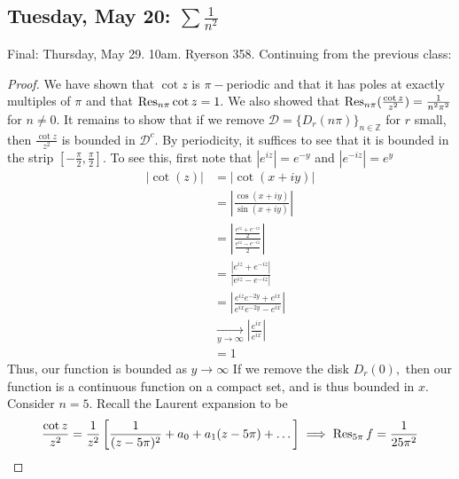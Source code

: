 \documentclass[10pt, oneside]{article}
\newcommand{\bbZ}{\mathbb{Z}}
\theoremstyle{definition}
\begin{document}
\subsection{Tuesday, May 20: $\sum \frac{1}{n^2}$}
Final: Thursday, May 29. 10am. Ryerson 358. Continuing from the previous class:
\begin{proof}
    We have shown that $\cot z$ is $\pi-$periodic and that it has poles at exactly multiples of $\pi$ and that $\Res_{n\pi} \cot z = 1.$ We also showed that $\Res_{n\pi}(\frac{\cot z}{z^2}) = \frac{1}{n^2 \pi^2}$ for $n \neq 0.$ It remains to show that if we remove $\mathcal{D} = \{D_{r}(n\pi)\}_{n \in \bbZ}$ for $r$ small, then $\frac{\cot z}{z^2}$ is bounded in $\mathcal{D}^c.$ By periodicity, it suffices to see that it is bounded  in the strip $[-\frac{\pi}{2}, \frac{\pi}{2}].$ To see this, first note that $|e^{iz}| = e^{-y}$ and $|e^{-iz}| = e^y$
    \begin{align*}
        |\cot (z)| &= |\cot (x + iy)|\\
        &= \left|\frac{\cos (x + iy)}{\sin (x + iy)}\right|\\
        &= \left|\frac{\frac{e^{iz} + e^{-iz}}{2}}{\frac{e^{iz} - e^{-iz}}{2}}\right|\\
        &= \frac{|e^{iz} + e^{-iz}|}{|e^{iz} - e^{-iz}|}\\
        &= |\frac{e^{iz}e^{-2y} + e^{ix}}{e^{ix}e^{-2y} - e^{ix}}|\\
        &\xrightarrow[y\to \infty]{} |\frac{e^{ix}}{e^{ix}}|\\
        &= 1
    \end{align*}
    Thus, our function is bounded as $y\to \infty$ If we remove the disk $D_r(0),$ then our function is a continuous function on a compact set, and is thus bounded in $x.$ Consider $n = 5.$ Recall the Laurent expansion to be 
    \[\frac{\cot z}{z^2} = \frac{1}{z^2}\left[\frac{1}{(z - 5\pi)^2} + a_0 + a_1(z - 5\pi) + \dots\right] \implies \Res_{5\pi }f =  \frac{1}{25\pi^2}\]


\end{proof}
\end{document}
